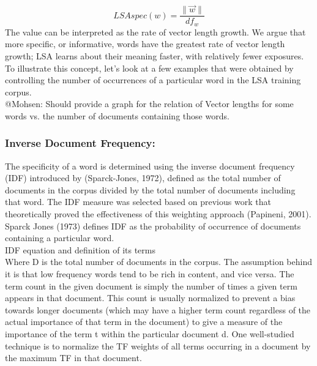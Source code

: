\begin{equation}
LSAspec(w)=\frac{\| \overrightarrow{w}\|}{df_w}
\end{equation}
The value can be interpreted as the rate of vector length growth. We argue that more specific, or informative, words have the greatest rate of vector length growth; LSA learns about their meaning faster, with relatively fewer exposures. To illustrate this concept, let's look at a few examples that were obtained by controlling the number of occurrences of a particular word in the LSA training corpus. \\
@Mohsen: Should provide a graph for the relation of Vector lengths for some words vs. the number of documents containing those words.\\

\subsubsection{Inverse Document Frequency:}
The specificity of a word is determined using the inverse document frequency (IDF) introduced by (Sparck-Jones, 1972), defined as the total number of documents in the corpus divided by the total number of documents including that word. The IDF measure was selected based on previous work that theoretically proved the effectiveness of this weighting approach (Papineni, 2001). Sparck Jones (1973) defines IDF as the probability of occurrence of documents containing a particular word.\\
IDF equation and definition of its terms\\
Where D is the total number of documents in the corpus. The assumption behind it is that low frequency words tend to be rich in content, and vice versa.
The term count in the given document is simply the number of times a given term appears in that document. This count is usually normalized to prevent a bias towards longer documents (which may have a higher term count regardless of the actual importance of that term in the document) to give a measure of the importance of the term t within the particular document d. One well-studied technique is to normalize the TF weights of all terms occurring in a document by the maximum TF in that document\citep{tfidf_1}.\\
